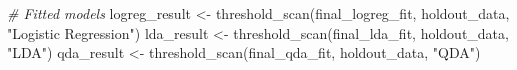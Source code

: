 \documentclass[
]{article}
\newenvironment{Shaded}{\begin{snugshade}}{\end{snugshade}}
\newcommand{\CommentTok}[1]{\textcolor[rgb]{0.56,0.35,0.01}{\textit{#1}}}
\newcommand{\FunctionTok}[1]{\textcolor[rgb]{0.00,0.00,0.00}{#1}}
\newcommand{\NormalTok}[1]{#1}
\newcommand{\OtherTok}[1]{\textcolor[rgb]{0.56,0.35,0.01}{#1}}
\newcommand{\SpecialCharTok}[1]{\textcolor[rgb]{0.00,0.00,0.00}{#1}}
\newcommand{\StringTok}[1]{\textcolor[rgb]{0.31,0.60,0.02}{#1}}
\begin{document}
\begin{Shaded}
\begin{Highlighting}[]
\CommentTok{\# Fitted models}
\NormalTok{logreg\_result }\OtherTok{\textless{}{-}} \FunctionTok{threshold\_scan}\NormalTok{(final\_logreg\_fit, holdout\_data, }\StringTok{"Logistic Regression"}\NormalTok{)}
\NormalTok{lda\_result    }\OtherTok{\textless{}{-}} \FunctionTok{threshold\_scan}\NormalTok{(final\_lda\_fit, holdout\_data, }\StringTok{"LDA"}\NormalTok{)}
\NormalTok{qda\_result    }\OtherTok{\textless{}{-}} \FunctionTok{threshold\_scan}\NormalTok{(final\_qda\_fit, holdout\_data, }\StringTok{"QDA"}\NormalTok{)}
\end{Highlighting}
\end{Shaded}

\begin{Shaded}
\end{Shaded}
\end{document}
